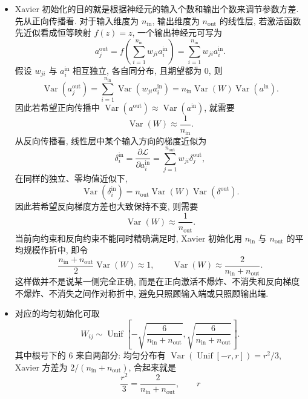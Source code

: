 \documentclass{../nndlcourse}
\begin{document}
\begin{enumerate}
\begin{itemize}
      \item Xavier 初始化的目的就是根据神经元的输入个数和输出个数来调节参数方差. 先从正向传播看. 对于输入维度为 $n_{\mathrm{in}}$, 输出维度为 $n_{\mathrm{out}}$ 的线性层, 若激活函数先近似看成恒等映射 $f(z)=z$, 一个输出神经元可写为
      \[
        a_j^{\mathrm{out}}
        =
        f\left(\sum_{i=1}^{n_{\mathrm{in}}} w_{ji}a_i^{\mathrm{in}}\right)
        =
        \sum_{i=1}^{n_{\mathrm{in}}} w_{ji}a_i^{\mathrm{in}}.
      \]
      假设 $w_{ji}$ 与 $a_i^{\mathrm{in}}$ 相互独立, 各自同分布, 且期望都为 $0$, 则
      \[
        \operatorname{Var}(a_j^{\mathrm{out}})
        =
        \sum_{i=1}^{n_{\mathrm{in}}}
        \operatorname{Var}(w_{ji}a_i^{\mathrm{in}})
        =
        n_{\mathrm{in}}\operatorname{Var}(W)\operatorname{Var}(a^{\mathrm{in}}).
      \]
      因此若希望正向传播中 $\operatorname{Var}(a^{\mathrm{out}})\approx\operatorname{Var}(a^{\mathrm{in}})$, 就需要
      \[
        \operatorname{Var}(W)\approx\frac{1}{n_{\mathrm{in}}}.
      \]
      从反向传播看, 线性层中某个输入方向的梯度近似为
      \[
        \delta_i^{\mathrm{in}}
        =
        \frac{\partial\mathcal{L}}{\partial a_i^{\mathrm{in}}}
        =
        \sum_{j=1}^{n_{\mathrm{out}}} w_{ji}\delta_j^{\mathrm{out}},
      \]
      在同样的独立、零均值近似下,
      \[
        \operatorname{Var}(\delta_i^{\mathrm{in}})
        =
        n_{\mathrm{out}}\operatorname{Var}(W)\operatorname{Var}(\delta^{\mathrm{out}}).
      \]
      因此若希望反向梯度方差也大致保持不变, 则需要
      \[
        \operatorname{Var}(W)\approx\frac{1}{n_{\mathrm{out}}}.
      \]
      当前向约束和反向约束不能同时精确满足时, Xavier 初始化用 $n_{\mathrm{in}}$ 与 $n_{\mathrm{out}}$ 的平均规模作折中, 即令
      \[
        \frac{n_{\mathrm{in}}+n_{\mathrm{out}}}{2}\operatorname{Var}(W)\approx 1,
        \qquad
        \operatorname{Var}(W) \approx \frac{2}{n_{\mathrm{in}}+n_{\mathrm{out}}}.
      \]
      这样做并不是说某一侧完全正确, 而是在正向激活不爆炸、不消失和反向梯度不爆炸、不消失之间作对称折中, 避免只照顾输入端或只照顾输出端.
      \item 对应的均匀初始化可取
      \[
        W_{ij}\sim\operatorname{Unif}
        \left[-\sqrt{\frac{6}{n_{\mathrm{in}}+n_{\mathrm{out}}}},
        \sqrt{\frac{6}{n_{\mathrm{in}}+n_{\mathrm{out}}}}\right].
      \]
      其中根号下的 $6$ 来自两部分: 均匀分布有 $\operatorname{Var}(\operatorname{Unif}[-r,r])=r^2/3$, Xavier 方差为 $2/(n_{\mathrm{in}}+n_{\mathrm{out}})$, 合起来就是
      \[
        \frac{r^2}{3}
        =
        \frac{2}{n_{\mathrm{in}}+n_{\mathrm{out}}},
        \qquad
        r
\]
\end{itemize}
\end{enumerate}
\end{document}
